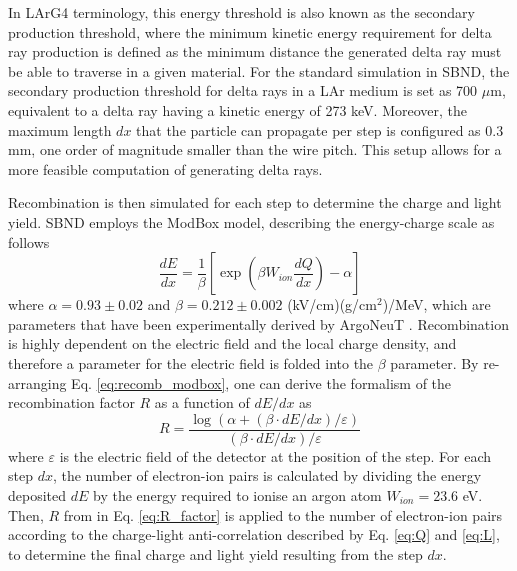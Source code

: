 In LArG4 terminology, this energy threshold is also known as the secondary production threshold, where the minimum kinetic energy requirement for delta ray production is defined as the minimum distance the generated delta ray must be able to traverse in a given material. 
For the standard simulation in SBND, the secondary production threshold for delta rays in a LAr medium is set as 700 $\mu$m, equivalent to a delta ray having a kinetic energy of 273 keV.
Moreover, the maximum length $dx$ that the particle can propagate per step is configured as 0.3 mm, one order of magnitude smaller than the wire pitch.
This setup allows for a more feasible computation of generating delta rays.

Recombination is then simulated for each step to determine the charge and light yield.
SBND employs the ModBox model, describing the energy-charge scale as follows
\begin{equation}
	\label{eq:recomb_modbox}
	\frac{dE}{dx} = \frac{1}{\beta}\left[ \exp{\left( \beta W_{ion}  \frac{dQ}{dx}\right)} -\alpha \right]
\end{equation}
where $\alpha = 0.93\pm0.02$ and $\beta = 0.212\pm0.002$ (kV/cm)(g/cm$^{2}$)/MeV, which are parameters that have been experimentally derived by ArgoNeuT \cite{argoneut_recomb}.
Recombination is highly dependent on the electric field and the local charge density, and therefore a parameter for the electric field is folded into the $\beta$ parameter.
By re-arranging Eq. \ref{eq:recomb_modbox}, one can derive the formalism of the recombination factor $R$ as a function of $dE/dx$ as
\begin{equation}
	\label{eq:R_factor}
	R = \frac{\log{ \left( \alpha + \left(\beta \cdot dE/dx\right)/\varepsilon \right)}}{\left(\beta \cdot dE/dx\right)/\varepsilon} 
\end{equation}
where $\varepsilon$ is the electric field of the detector at the position of the step.
For each step $dx$, the number of electron-ion pairs is calculated by dividing the energy deposited $dE$ by the energy required to ionise an argon atom $W_{ion} = 23.6$ eV. 
Then, $R$ from in Eq. \ref{eq:R_factor} is applied to the number of electron-ion pairs according to the charge-light anti-correlation described by Eq. \ref{eq:Q} and \ref{eq:L}, to determine the final charge and light yield resulting from the step $dx$.

